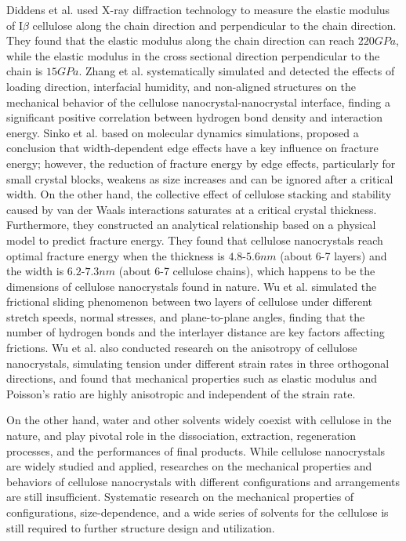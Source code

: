 \documentclass{article}
\begin{document}
Diddens et al. used X-ray diffraction technology to measure the elastic modulus of I$\beta$ cellulose along the chain direction and perpendicular to the chain direction.
They found that the elastic modulus along the chain direction can reach $220 GPa$, while the elastic modulus in the cross sectional direction perpendicular to the chain is $15 GPa$\cite{diddens2008anisotropic}.
Zhang et al. systematically simulated and detected the effects of loading direction, interfacial humidity, and non-aligned structures on the mechanical behavior of the cellulose nanocrystal-nanocrystal interface, finding a significant positive correlation between hydrogen bond density and interaction energy\cite{zhang2021hydrogen}.
Sinko et al. based on molecular dynamics simulations, proposed a conclusion that width-dependent edge effects have a key influence on fracture energy; however, the reduction of fracture energy by edge effects, particularly for small crystal blocks, weakens as size increases and can be ignored after a critical width.
On the other hand, the collective effect of cellulose stacking and stability caused by van der Waals interactions saturates at a critical crystal thickness.
Furthermore, they constructed an analytical relationship based on a physical model to predict fracture energy.
They found that cellulose nanocrystals reach optimal fracture energy when the thickness is $4.8$-$5.6 nm$ (about 6-7 layers) and the width is $6.2$-$7.3 nm$ (about 6-7 cellulose chains), which happens to be the dimensions of cellulose nanocrystals found in nature\cite{sinko2014dimensions}.
Wu et al. simulated the frictional sliding phenomenon between two layers of cellulose under different stretch speeds, normal stresses, and plane-to-plane angles, finding that the number of hydrogen bonds and the interlayer distance are key factors affecting frictions\cite{wu2013atomistic}.
Wu et al. also conducted research on the anisotropy of cellulose nanocrystals, simulating tension under different strain rates in three orthogonal directions, and found that mechanical properties such as elastic modulus and Poisson's ratio are highly anisotropic and independent of the strain rate\cite{wu2014tensile}.

On the other hand, water and other solvents widely coexist with cellulose in the nature\cite{kim2015review}, and play pivotal role in the dissociation, extraction, regeneration processes, and the performances of final products\cite{wang2020highly,he2021effects,fink2001structure,swatloski2002dissolution,matsumoto2001solution,peng2021cellulose,zhang2019non,liu2009supramolecular}.
While cellulose nanocrystals are widely studied and applied, researches on the mechanical properties and behaviors of cellulose nanocrystals with different configurations and arrangements are still insufficient.
Systematic research on the mechanical properties of configurations, size-dependence, and a wide series of solvents for the cellulose is still required to further structure design and utilization.
\end{document}
